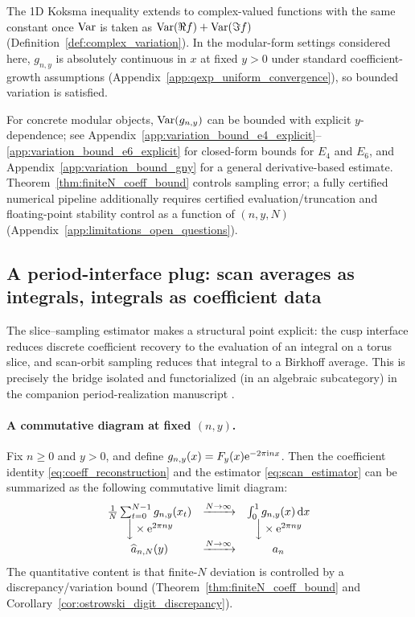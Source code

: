 \begin{remark}
The 1D Koksma inequality extends to complex-valued functions with the same constant once $\mathrm{Var}$ is taken as $\mathrm{Var}(\Re f)+\mathrm{Var}(\Im f)$ (Definition~\ref{def:complex_variation}). In the modular-form settings considered here, $g_{n,y}$ is absolutely continuous in $x$ at fixed $y>0$ under standard coefficient-growth assumptions (Appendix~\ref{app:qexp_uniform_convergence}), so bounded variation is satisfied.
\end{remark}
\begin{remark}
For concrete modular objects, $\mathrm{Var}(g_{n,y})$ can be bounded with explicit $y$-dependence; see Appendix~\ref{app:variation_bound_e4_explicit}--\ref{app:variation_bound_e6_explicit} for closed-form bounds for $E_4$ and $E_6$, and Appendix~\ref{app:variation_bound_gny} for a general derivative-based estimate.
Theorem~\ref{thm:finiteN_coeff_bound} controls sampling error; a fully certified numerical pipeline additionally requires certified evaluation/truncation and floating-point stability control as a function of $(n,y,N)$ (Appendix~\ref{app:limitations_open_questions}).
\end{remark}

\subsection{A period-interface plug: scan averages as integrals, integrals as coefficient data}
\label{sec:period_interface_plug}

The slice--sampling estimator makes a structural point explicit: the cusp interface reduces discrete coefficient recovery to the evaluation of an integral on a torus slice, and scan-orbit sampling reduces that integral to a Birkhoff average. This is precisely the bridge isolated and functorialized (in an algebraic subcategory) in the companion period-realization manuscript \cite{Ma2025MAI}.

\paragraph{A commutative diagram at fixed $(n,y)$.}
Fix $n\ge 0$ and $y>0$, and define $g_{n,y}(x)=F_y(x)\mathrm{e}^{-2\pi\mathrm{i} n x}$. Then the coefficient identity \eqref{eq:coeff_reconstruction} and the estimator \eqref{eq:scan_estimator} can be summarized as the following commutative limit diagram:
\[
\begin{array}{ccc}
\frac{1}{N}\sum_{t=0}^{N-1} g_{n,y}(x_t) & \xrightarrow{N\to\infty} & \int_0^1 g_{n,y}(x)\,\mathrm{d} x \\
\Big\downarrow \times \mathrm{e}^{2\pi n y} &  & \Big\downarrow \times \mathrm{e}^{2\pi n y} \\
\widehat a_{n,N}(y) & \xrightarrow{N\to\infty} & a_n
\end{array}
\]
The quantitative content is that finite-$N$ deviation is controlled by a discrepancy/variation bound (Theorem~\ref{thm:finiteN_coeff_bound} and Corollary~\ref{cor:ostrowski_digit_discrepancy}).


